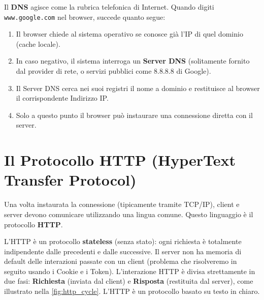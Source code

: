 \documentclass[11pt,a4paper]{report}
\begin{document}
Il \textbf{DNS} agisce come la rubrica telefonica di Internet. Quando digiti \texttt{www.google.com} nel browser, succede quanto segue:
\begin{enumerate}
    \item Il browser chiede al sistema operativo se conosce già l'IP di quel dominio (cache locale).
    \item In caso negativo, il sistema interroga un \textbf{Server DNS} (solitamente fornito dal provider di rete, o servizi pubblici come 8.8.8.8 di Google).
    \item Il Server DNS cerca nei suoi registri il nome a dominio e restituisce al browser il corrispondente Indirizzo IP.
    \item Solo a questo punto il browser può instaurare una connessione diretta con il server.
\end{enumerate}

\section{Il Protocollo HTTP (HyperText Transfer Protocol)}
Una volta instaurata la connessione (tipicamente tramite TCP/IP), client e server devono comunicare utilizzando una lingua comune. Questo linguaggio è il protocollo \textbf{HTTP}.

L'HTTP è un protocollo \textbf{stateless} (senza stato): ogni richiesta è totalmente indipendente dalle precedenti e dalle successive. Il server non ha memoria di default delle interazioni passate con un client (problema che risolveremo in seguito usando i Cookie e i Token).
L'interazione HTTP è divisa strettamente in due fasi: \textbf{Richiesta} (inviata dal client) e \textbf{Risposta} (restituita dal server), come illustrato nella \cref{fig:http_cycle}. L'HTTP è un protocollo basato su testo in chiaro.
\end{document}
